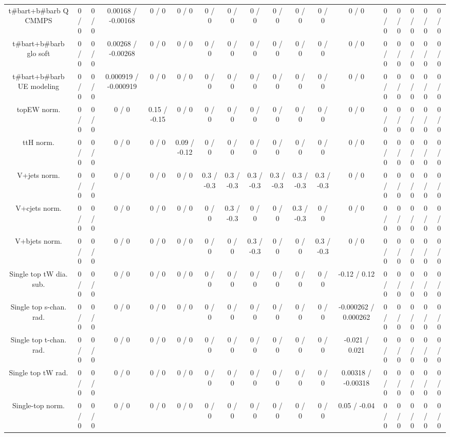 \documentclass[10pt]{article}
\begin{document}
\begin{table}[htbp]
\begin{center}
\begin{tabular}{|c|c|c|c|c|c|c|c|c|c|c|c|c|c|c|c|c|c|}
  t#bar{t}+b#bar{b} Q CMMPS & 0 / 0 & 0 / 0 & 0.00168 / -0.00168 & 0 / 0 & 0 / 0 & 0 / 0 & 0 / 0 & 0 / 0 & 0 / 0 & 0 / 0 & 0 / 0 & 0 / 0 & 0 / 0 & 0 / 0 & 0 / 0 & 0 / 0 & 0 / 0 \\ 
  t#bar{t}+b#bar{b} glo soft & 0 / 0 & 0 / 0 & 0.00268 / -0.00268 & 0 / 0 & 0 / 0 & 0 / 0 & 0 / 0 & 0 / 0 & 0 / 0 & 0 / 0 & 0 / 0 & 0 / 0 & 0 / 0 & 0 / 0 & 0 / 0 & 0 / 0 & 0 / 0 \\ 
  t#bar{t}+b#bar{b} UE modeling & 0 / 0 & 0 / 0 & 0.000919 / -0.000919 & 0 / 0 & 0 / 0 & 0 / 0 & 0 / 0 & 0 / 0 & 0 / 0 & 0 / 0 & 0 / 0 & 0 / 0 & 0 / 0 & 0 / 0 & 0 / 0 & 0 / 0 & 0 / 0 \\ 
  topEW norm. & 0 / 0 & 0 / 0 & 0 / 0 & 0.15 / -0.15 & 0 / 0 & 0 / 0 & 0 / 0 & 0 / 0 & 0 / 0 & 0 / 0 & 0 / 0 & 0 / 0 & 0 / 0 & 0 / 0 & 0 / 0 & 0 / 0 & 0 / 0 \\ 
  ttH norm. & 0 / 0 & 0 / 0 & 0 / 0 & 0 / 0 & 0.09 / -0.12 & 0 / 0 & 0 / 0 & 0 / 0 & 0 / 0 & 0 / 0 & 0 / 0 & 0 / 0 & 0 / 0 & 0 / 0 & 0 / 0 & 0 / 0 & 0 / 0 \\ 
  V+jets norm. & 0 / 0 & 0 / 0 & 0 / 0 & 0 / 0 & 0 / 0 & 0.3 / -0.3 & 0.3 / -0.3 & 0.3 / -0.3 & 0.3 / -0.3 & 0.3 / -0.3 & 0.3 / -0.3 & 0 / 0 & 0 / 0 & 0 / 0 & 0 / 0 & 0 / 0 & 0 / 0 \\ 
  V+cjets norm. & 0 / 0 & 0 / 0 & 0 / 0 & 0 / 0 & 0 / 0 & 0 / 0 & 0.3 / -0.3 & 0 / 0 & 0 / 0 & 0.3 / -0.3 & 0 / 0 & 0 / 0 & 0 / 0 & 0 / 0 & 0 / 0 & 0 / 0 & 0 / 0 \\ 
  V+bjets norm. & 0 / 0 & 0 / 0 & 0 / 0 & 0 / 0 & 0 / 0 & 0 / 0 & 0 / 0 & 0.3 / -0.3 & 0 / 0 & 0 / 0 & 0.3 / -0.3 & 0 / 0 & 0 / 0 & 0 / 0 & 0 / 0 & 0 / 0 & 0 / 0 \\ 
  Single top tW dia. sub. & 0 / 0 & 0 / 0 & 0 / 0 & 0 / 0 & 0 / 0 & 0 / 0 & 0 / 0 & 0 / 0 & 0 / 0 & 0 / 0 & 0 / 0 & -0.12 / 0.12 & 0 / 0 & 0 / 0 & 0 / 0 & 0 / 0 & 0 / 0 \\ 
  Single top s-chan. rad. & 0 / 0 & 0 / 0 & 0 / 0 & 0 / 0 & 0 / 0 & 0 / 0 & 0 / 0 & 0 / 0 & 0 / 0 & 0 / 0 & 0 / 0 & -0.000262 / 0.000262 & 0 / 0 & 0 / 0 & 0 / 0 & 0 / 0 & 0 / 0 \\ 
  Single top t-chan. rad. & 0 / 0 & 0 / 0 & 0 / 0 & 0 / 0 & 0 / 0 & 0 / 0 & 0 / 0 & 0 / 0 & 0 / 0 & 0 / 0 & 0 / 0 & -0.021 / 0.021 & 0 / 0 & 0 / 0 & 0 / 0 & 0 / 0 & 0 / 0 \\ 
  Single top tW rad. & 0 / 0 & 0 / 0 & 0 / 0 & 0 / 0 & 0 / 0 & 0 / 0 & 0 / 0 & 0 / 0 & 0 / 0 & 0 / 0 & 0 / 0 & 0.00318 / -0.00318 & 0 / 0 & 0 / 0 & 0 / 0 & 0 / 0 & 0 / 0 \\ 
  Single-top norm. & 0 / 0 & 0 / 0 & 0 / 0 & 0 / 0 & 0 / 0 & 0 / 0 & 0 / 0 & 0 / 0 & 0 / 0 & 0 / 0 & 0 / 0 & 0.05 / -0.04 & 0 / 0 & 0 / 0 & 0 / 0 & 0 / 0 & 0 / 0 \\ 

\end{tabular}
\end{center}
\end{table}
\end{document}
